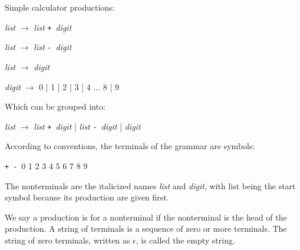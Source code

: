 \documentclass[12pt,a4paper,oneside,draft]{report}
\def\Plus{\texttt{+}}
\def\Minus{\texttt{-}}
\begin{document}
\noindent Simple calculator productions:
\begin{center}
\begin{varwidth}{\textwidth}
\item[] \emph{list} $\rightarrow$ \emph{list} \Plus\ \emph{digit}
\item[] \emph{list} $\rightarrow$ \emph{list} \Minus\ \emph{digit}
\item[] \emph{list} $\rightarrow$ \emph{digit}
\item[] \emph{digit} $\rightarrow$ 0 | 1 | 2 | 3 | 4  ... 8 | 9
\end{varwidth}
\end{center}
Which can be grouped into:
\begin{center}
\begin{varwidth}{\textwidth}
\item \emph{list} $\rightarrow$ \emph{list} \Plus\ \emph{digit} | \emph{list} \Minus\ \emph{digit} | \emph{digit}
\end{varwidth}
\end{center}
According to conventions, the terminals of the grammar are symbols:
\begin{center}
\begin{varwidth}{\textwidth}
\item \Plus\ \Minus\ 0 1 2 3 4 5 6 7 8 9
\end{varwidth}
\end{center}

The nonterminals are the italicized names \emph{list} and \emph{digit}, with list being the start symbol because its production are given first.

We say a production is for a nonterminal if the nonterminal is the head of the production. A string of terminals is a sequence of zero or more terminals. The string of zero terminals, written as $\epsilon$, is called the empty string.
\end{document}
